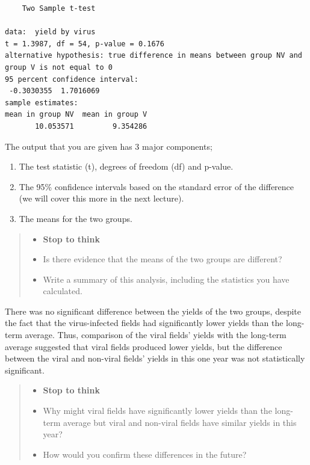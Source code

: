 \documentclass[
]{book}
\providecommand{\tightlist}{%
  \setlength{\itemsep}{0pt}\setlength{\parskip}{0pt}}
\begin{document}
\begin{verbatim}
    Two Sample t-test

data:  yield by virus
t = 1.3987, df = 54, p-value = 0.1676
alternative hypothesis: true difference in means between group NV and group V is not equal to 0
95 percent confidence interval:
 -0.3030355  1.7016069
sample estimates:
mean in group NV  mean in group V 
       10.053571         9.354286 
\end{verbatim}

The output that you are given has 3 major components;

\begin{enumerate}
\def\labelenumi{\arabic{enumi})}
\tightlist
\item
  The test statistic (t), degrees of freedom (df) and p-value.
\item
  The 95\% confidence intervals based on the standard error of the difference (we will cover this more in the next lecture).
\item
  The means for the two groups.
\end{enumerate}

\begin{quote}
\begin{itemize}
\tightlist
\item
  \textbf{Stop to think}
\item
  Is there evidence that the means of the two groups are different?
\item
  Write a summary of this analysis, including the statistics you have calculated.
\end{itemize}
\end{quote}

There was no significant difference between the yields of the two groups, despite the fact that the virus-infected fields had significantly lower yields than the long-term average. Thus, comparison of the viral fields' yields with the long-term average suggested that viral fields produced lower yields, but the difference between the viral and non-viral fields' yields in this one year was not statistically significant.

\begin{quote}
\begin{itemize}
\tightlist
\item
  \textbf{Stop to think}
\item
  Why might viral fields have significantly lower yields than the long-term average but viral and non-viral fields have similar yields in this year?
\item
  How would you confirm these differences in the future?
\end{itemize}
\end{quote}
\end{document}
